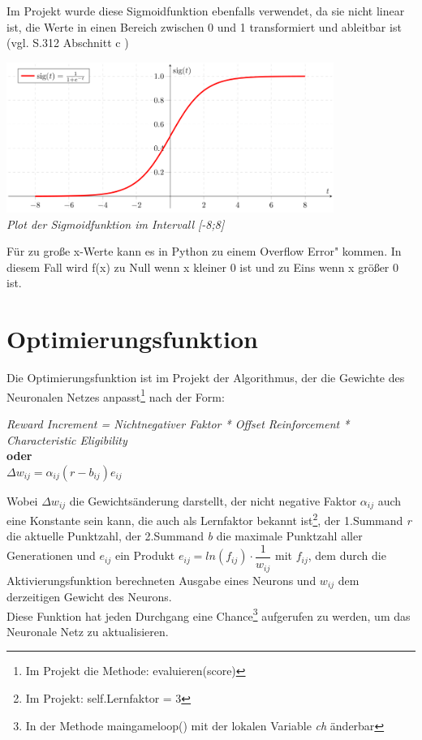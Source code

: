 Im Projekt wurde diese Sigmoidfunktion ebenfalls verwendet, da sie nicht linear ist, die Werte in einen Bereich zwischen 0 und 1 transformiert und ableitbar ist (vgl. \citeauthor{sharma2017activation} \citeyear{sharma2017activation} S.312 Abschnitt c )\\
\begin{center}


\includegraphics[width=0.8\textwidth]{Bilder/Sigmoid-function-2.png}\\
\textit{\small{Plot der Sigmoidfunktion im Intervall }[-8;8]}
\end{center}
Für zu große x-Werte kann es in Python zu einem \glqq Overflow Error" kommen. In diesem Fall wird f(x) zu Null wenn x kleiner 0 ist und zu Eins wenn x größer 0 ist. 
\section{Optimierungsfunktion}
Die Optimierungsfunktion ist im Projekt der Algorithmus, der die Gewichte des Neuronalen Netzes anpasst\footnote{Im Projekt die Methode: evaluieren(score)} nach der Form:\\
\begin{center}


\textit{Reward Increment = Nichtnegativer Faktor * Offset Reinforcement * Characteristic Eligibility} \cite[vgl.][S.234]{williams1992simple}\\ \textbf{oder}
\\
$\Delta w_{ij} = \alpha _{ij}(r-b_{ij})e_{ij}$\\
\end{center}
Wobei $\Delta w_{ij}$ die Gewichtsänderung darstellt, der nicht negative Faktor $\alpha _{ij}$ auch eine Konstante sein kann, die auch als Lernfaktor bekannt ist\footnote{Im Projekt: self.Lernfaktor = 3}, der 1.Summand \textit{r} die aktuelle Punktzahl, der 2.Summand \textit{b} die maximale Punktzahl aller Generationen und $e_{ij}$ ein Produkt
$e_{ij} =ln(f_{ij})\cdot{}\dfrac{1}{w_{ij}}$ mit $f_{ij}$, dem durch die Aktivierungsfunktion berechneten Ausgabe eines Neurons und $w_{ij}$ dem derzeitigen Gewicht des Neurons.\\
Diese Funktion hat jeden Durchgang eine Chance\footnote{ In der Methode maingameloop() mit der lokalen Variable \textit{ch} änderbar} aufgerufen zu werden, um das Neuronale Netz zu aktualisieren.\label{OptF}
